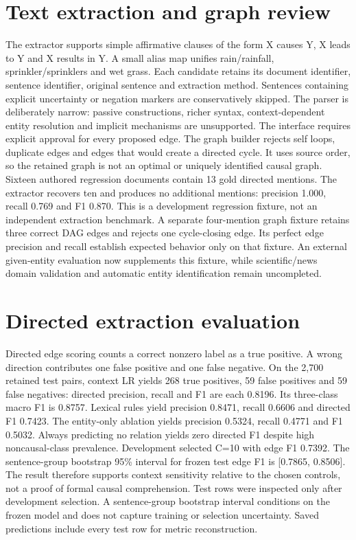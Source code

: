 \documentclass[conference]{IEEEtran}
\begin{document}
\section{Text extraction and graph review}
The extractor supports simple affirmative clauses of the form X causes Y, X leads to Y and X results in Y. A small alias map unifies rain/rainfall, sprinkler/sprinklers and wet grass. Each candidate retains its document identifier, sentence identifier, original sentence and extraction method. Sentences containing explicit uncertainty or negation markers are conservatively skipped. The parser is deliberately narrow: passive constructions, richer syntax, context-dependent entity resolution and implicit mechanisms are unsupported. The interface requires explicit approval for every proposed edge. The graph builder rejects self loops, duplicate edges and edges that would create a directed cycle. It uses source order, so the retained graph is not an optimal or uniquely identified causal graph. Sixteen authored regression documents contain 13 gold directed mentions. The extractor recovers ten and produces no additional mentions: precision 1.000, recall 0.769 and F1 0.870. This is a development regression fixture, not an independent extraction benchmark. A separate four-mention graph fixture retains three correct DAG edges and rejects one cycle-closing edge. Its perfect edge precision and recall establish expected behavior only on that fixture. An external given-entity evaluation now supplements this fixture, while scientific/news domain validation and automatic entity identification remain uncompleted.
\section{Directed extraction evaluation}
Directed edge scoring counts a correct nonzero label as a true positive. A wrong direction contributes one false positive and one false negative. On the 2,700 retained test pairs, context LR yields 268 true positives, 59 false positives and 59 false negatives: directed precision, recall and F1 are each 0.8196. Its three-class macro F1 is 0.8757. Lexical rules yield precision 0.8471, recall 0.6606 and directed F1 0.7423. The entity-only ablation yields precision 0.5324, recall 0.4771 and F1 0.5032. Always predicting no relation yields zero directed F1 despite high noncausal-class prevalence. Development selected C=10 with edge F1 0.7392. The sentence-group bootstrap 95\% interval for frozen test edge F1 is [0.7865, 0.8506]. The result therefore supports context sensitivity relative to the chosen controls, not a proof of formal causal comprehension. Test rows were inspected only after development selection. A sentence-group bootstrap interval conditions on the frozen model and does not capture training or selection uncertainty. Saved predictions include every test row for metric reconstruction.
\end{document}
